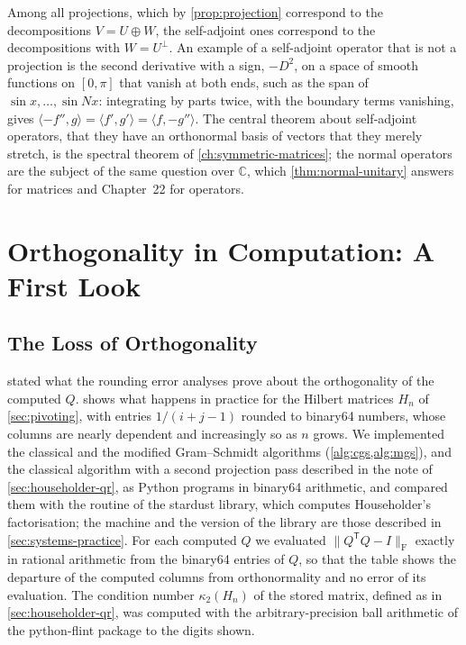 Among all projections, which by \cref{prop:projection} correspond to the decompositions $V=U\oplus W$, the self-adjoint ones correspond to the decompositions with $W=U^\perp$. An example of a self-adjoint operator that is not a projection is the second derivative with a sign, $-D^2$, on a space of smooth functions on $[0,\pi]$ that vanish at both ends, such as the span of $\sin x,\ldots,\sin Nx$: integrating by parts twice, with the boundary terms vanishing, gives $\langle-f'',g\rangle=\langle f',g'\rangle=\langle f,-g''\rangle$. The central theorem about self-adjoint operators, that they have an orthonormal basis of vectors that they merely stretch, is the spectral theorem of \cref{ch:symmetric-matrices}; the normal operators are the subject of the same question over $\mathbb C$, which \cref{thm:normal-unitary} answers for matrices and Chapter~22 for operators.

\section{Orthogonality in Computation: A First Look}
\label{sec:orthogonality-computation}

\subsection{The Loss of Orthogonality}

 stated what the rounding error analyses prove about the orthogonality of the computed $Q$.  shows what happens in practice for the Hilbert matrices $H_n$ of \cref{sec:pivoting}, with entries $1/(i+j-1)$ rounded to binary64 numbers, whose columns are nearly dependent and increasingly so as $n$ grows. We implemented the classical and the modified Gram--Schmidt algorithms (\cref{alg:cgs,alg:mgs}), and the classical algorithm with a second projection pass described in the note of \cref{sec:householder-qr}, as Python programs in binary64 arithmetic, and compared them with the routine  of the stardust library, which computes Householder's factorisation; the machine and the version of the library are those described in \cref{sec:systems-practice}. For each computed $Q$ we evaluated $\|Q^{\mathsf T}Q-I\|_{\mathrm F}$ exactly in rational arithmetic from the binary64 entries of $Q$, so that the table shows the departure of the computed columns from orthonormality and no error of its evaluation. The condition number $\kappa_2(H_n)$ of the stored matrix, defined as in \cref{sec:householder-qr}, was computed with the arbitrary-precision ball arithmetic of the python-flint package to the digits shown.

